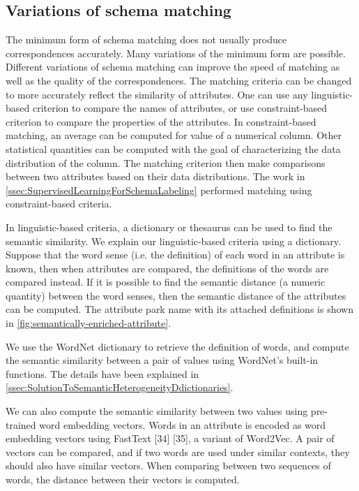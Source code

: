 \subsection{Variations of schema matching}
\label{ssec:VariationsOfSchemaMatching}

The minimum form of schema matching does not usually produce correspondences accurately. Many variations of the minimum form are possible. Different variations of schema matching can improve the speed of matching as well as the quality of the correspondences. The matching criteria can be changed to more accurately reflect the similarity of attributes. One can use any linguistic-based criterion to compare the names of attributes, or use constraint-based criterion to compare the properties of the attributes. In constraint-based matching, an average can be computed for value of a numerical column. Other statistical quantities can be computed with the goal of characterizing the data distribution of the column. The matching criterion then make comparisons between two attributes based on their data distributions. The work in \autoref{ssec:SupervisedLearningForSchemaLabeling} performed matching using constraint-based criteria.

In linguistic-based criteria, a dictionary or thesaurus can be used to find the semantic similarity. We explain our linguistic-based criteria using a dictionary. Suppose that the word sense (i.e. the definition) of each word in an attribute is known, then when attributes are compared, the definitions of the words are compared instead. If it is possible to find the semantic distance (a numeric quantity) between the word senses, then the semantic distance of the attributes can be computed. The attribute park name with its attached definitions is shown in \autoref{fig:semantically-enriched-attribute}.

We use the WordNet dictionary to retrieve the definition of words, and compute the semantic similarity between a pair of values using WordNet's built-in functions. The details have been explained in \autoref{ssec:SolutionToSemanticHeterogeneityDdictionaries}.

We can also compute the semantic similarity between two values using pre-trained word embedding vectors. Words in an attribute is encoded as word embedding vectors using FastText \cite{Mudgal2018Deep}[34] \cite{Nargesian2018Table}[35], a variant of Word2Vec. A pair of vectors can be compared, and if two words are used under similar contexts, they should also have similar vectors. When comparing between two sequences of words, the distance between their vectors is computed.

